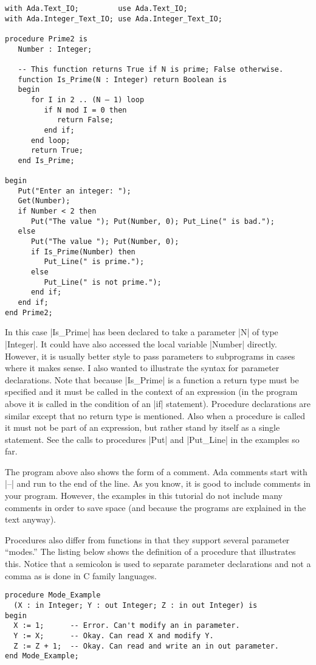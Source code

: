 \begin{lstlisting}
with Ada.Text_IO;         use Ada.Text_IO;
with Ada.Integer_Text_IO; use Ada.Integer_Text_IO;

procedure Prime2 is
   Number : Integer;

   -- This function returns True if N is prime; False otherwise.
   function Is_Prime(N : Integer) return Boolean is
   begin
      for I in 2 .. (N – 1) loop
         if N mod I = 0 then
            return False;
         end if;
      end loop;
      return True;
   end Is_Prime;

begin
   Put("Enter an integer: ");
   Get(Number);
   if Number < 2 then
      Put("The value "); Put(Number, 0); Put_Line(" is bad.");
   else
      Put("The value "); Put(Number, 0);
      if Is_Prime(Number) then
         Put_Line(" is prime.");
      else
         Put_Line(" is not prime.");
      end if;
   end if;
end Prime2;
\end{lstlisting}

In this case |Is_Prime| has been declared to take a parameter |N| of type |Integer|. It could
have also accessed the local variable |Number| directly. However, it is usually better style to
pass parameters to subprograms in cases where it makes sense. I also wanted to illustrate the
syntax for parameter declarations. Note that because |Is_Prime| is a function a return type must
be specified and it must be called in the context of an expression (in the program above it is
called in the condition of an |if| statement). Procedure declarations are similar except that no
return type is mentioned. Also when a procedure is called it must not be part of an expression,
but rather stand by itself as a single statement. See the calls to procedures |Put| and
|Put_Line| in the examples so far.

The program above also shows the form of a comment. Ada comments start with |--| and run to the
end of the line. As you know, it is good to include comments in your program. However, the
examples in this tutorial do not include many comments in order to save space (and because the
programs are explained in the text anyway).

Procedures also differ from functions in that they support several parameter ``modes.'' The
listing below shows the definition of a procedure that illustrates this. Notice that a
semicolon is used to separate parameter declarations and not a comma as is done in C family
languages.

\begin{lstlisting}
procedure Mode_Example
  (X : in Integer; Y : out Integer; Z : in out Integer) is
begin
  X := 1;      -- Error. Can't modify an in parameter.
  Y := X;      -- Okay. Can read X and modify Y.
  Z := Z + 1;  -- Okay. Can read and write an in out parameter.
end Mode_Example;
\end{lstlisting}

